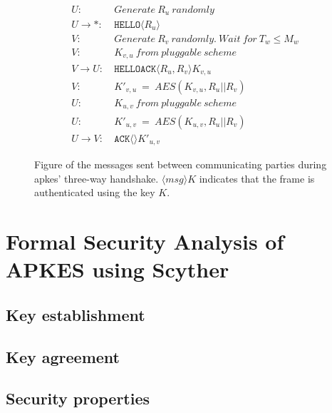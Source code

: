 
\begin{figure}[h]
\begin{tcolorbox}[title=Three-way handshake in APKES]
\begin{align*}
U:\ & Generate\ R_u\ randomly\\
U \rightarrow *:\ & \texttt{HELLO}\langle{R_u}\rangle{}\\
V:\ & Generate\ R_v\ randomly.\ Wait\ for\ T_w \leq M_w\\
V:\ & K_{v,u}\ from\ pluggable\ scheme\\
V \rightarrow U:\ & \texttt{HELLOACK}\langle{R_u, R_v}\rangle{K_{v,u}}\\
V:\ & K'_{v,u}\ =\ AES(K_{v,u}, R_u || R_v)\\
U:\ & K_{u,v}\ from\ pluggable\ scheme\\
U:\ & K'_{u,v}\ =\ AES(K_{u,v}, R_u || R_v)\\
U \rightarrow V:\ & \texttt{ACK}\langle{}\rangle{K'_{u,v}}
\end{align*}
\end{tcolorbox}
\caption{Figure of the messages sent between communicating parties during \gls{apkes}' three-way handshake. $\langle{msg}\rangle{K}$ indicates that the frame is authenticated using the key $K$.}
\label{fig:apkes-handshake}
\end{figure}










\section{Formal Security Analysis of APKES using Scyther}


\subsection{Key establishment}

\subsection{Key agreement}

\subsection{Security properties}

